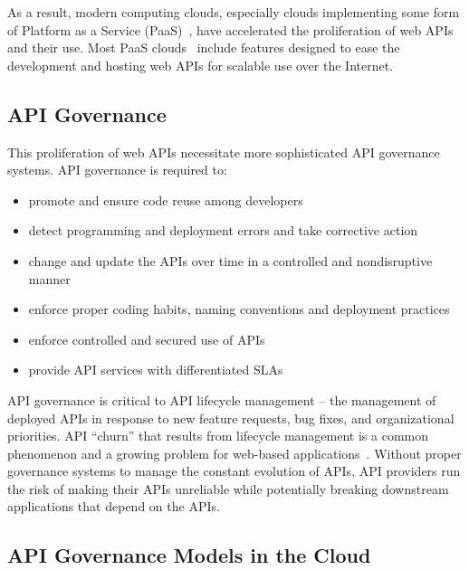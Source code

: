 As a result, modern computing clouds, especially clouds implementing some form
of Platform as a Service (PaaS)~\cite{4548165}, have accelerated the
proliferation of
web APIs and their use.  Most PaaS
clouds~\cite{appscale13,cloudfoundry,openshift} include
features designed to
ease the development and hosting web APIs for scalable use over the Internet. 

\subsection{API Governance}
This proliferation of web APIs necessitate more sophisticated API 
governance systems. API governance is required to:
\begin{itemize}
\item promote and ensure code reuse among developers
\item detect programming and deployment errors and take corrective action
\item change and update the APIs over time in a controlled and nondisruptive manner
\item enforce proper coding habits, naming conventions and deployment practices
\item enforce controlled and secured use of APIs
\item provide API services with differentiated SLAs
\end{itemize}


API governance is critical to API lifecycle
management --  the management of deployed APIs in response to new feature
requests, bug fixes, and organizational priorities. 
API ``churn'' that results from lifecycle management
is a common phenomenon and a growing
problem for web-based applications~\cite{portingeffort}.
Without proper governance systems to manage the constant evolution of APIs,
API providers run the risk of making their APIs unreliable while potentially
breaking downstream applications that depend on the APIs.

\subsection{API Governance Models in the Cloud}

